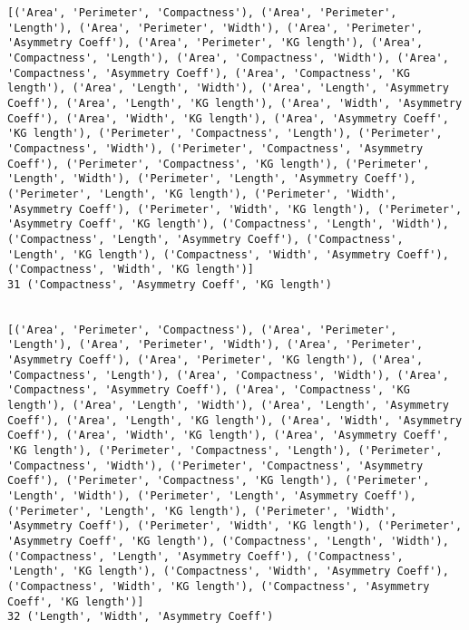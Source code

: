 \documentclass[11pt]{article}
\begin{document}
\begin{Verbatim}[commandchars=\\\{\}]
[('Area', 'Perimeter', 'Compactness'), ('Area', 'Perimeter', 'Length'), ('Area', 'Perimeter', 'Width'), ('Area', 'Perimeter', 'Asymmetry Coeff'), ('Area', 'Perimeter', 'KG length'), ('Area', 'Compactness', 'Length'), ('Area', 'Compactness', 'Width'), ('Area', 'Compactness', 'Asymmetry Coeff'), ('Area', 'Compactness', 'KG length'), ('Area', 'Length', 'Width'), ('Area', 'Length', 'Asymmetry Coeff'), ('Area', 'Length', 'KG length'), ('Area', 'Width', 'Asymmetry Coeff'), ('Area', 'Width', 'KG length'), ('Area', 'Asymmetry Coeff', 'KG length'), ('Perimeter', 'Compactness', 'Length'), ('Perimeter', 'Compactness', 'Width'), ('Perimeter', 'Compactness', 'Asymmetry Coeff'), ('Perimeter', 'Compactness', 'KG length'), ('Perimeter', 'Length', 'Width'), ('Perimeter', 'Length', 'Asymmetry Coeff'), ('Perimeter', 'Length', 'KG length'), ('Perimeter', 'Width', 'Asymmetry Coeff'), ('Perimeter', 'Width', 'KG length'), ('Perimeter', 'Asymmetry Coeff', 'KG length'), ('Compactness', 'Length', 'Width'), ('Compactness', 'Length', 'Asymmetry Coeff'), ('Compactness', 'Length', 'KG length'), ('Compactness', 'Width', 'Asymmetry Coeff'), ('Compactness', 'Width', 'KG length')]
31 ('Compactness', 'Asymmetry Coeff', 'KG length')


[('Area', 'Perimeter', 'Compactness'), ('Area', 'Perimeter', 'Length'), ('Area', 'Perimeter', 'Width'), ('Area', 'Perimeter', 'Asymmetry Coeff'), ('Area', 'Perimeter', 'KG length'), ('Area', 'Compactness', 'Length'), ('Area', 'Compactness', 'Width'), ('Area', 'Compactness', 'Asymmetry Coeff'), ('Area', 'Compactness', 'KG length'), ('Area', 'Length', 'Width'), ('Area', 'Length', 'Asymmetry Coeff'), ('Area', 'Length', 'KG length'), ('Area', 'Width', 'Asymmetry Coeff'), ('Area', 'Width', 'KG length'), ('Area', 'Asymmetry Coeff', 'KG length'), ('Perimeter', 'Compactness', 'Length'), ('Perimeter', 'Compactness', 'Width'), ('Perimeter', 'Compactness', 'Asymmetry Coeff'), ('Perimeter', 'Compactness', 'KG length'), ('Perimeter', 'Length', 'Width'), ('Perimeter', 'Length', 'Asymmetry Coeff'), ('Perimeter', 'Length', 'KG length'), ('Perimeter', 'Width', 'Asymmetry Coeff'), ('Perimeter', 'Width', 'KG length'), ('Perimeter', 'Asymmetry Coeff', 'KG length'), ('Compactness', 'Length', 'Width'), ('Compactness', 'Length', 'Asymmetry Coeff'), ('Compactness', 'Length', 'KG length'), ('Compactness', 'Width', 'Asymmetry Coeff'), ('Compactness', 'Width', 'KG length'), ('Compactness', 'Asymmetry Coeff', 'KG length')]
32 ('Length', 'Width', 'Asymmetry Coeff')



\end{Verbatim}
\end{document}
